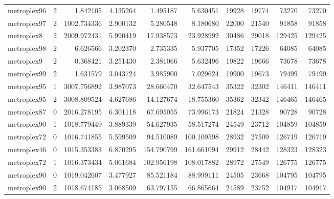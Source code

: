 \begin{longtable}{|l|r|r|r|r|r|r|r|r|r|}
metroplex96 & 2 & 1.842105 & 4.135264 & 1.495187 & 5.630451 & 19928 & 19774 & 73270 & 73270 \\
metroplex97 & 2 & 1002.734336 & 2.900132 & 5.280548 & 8.180680 & 22000 & 21540 & 91858 & 91858 \\
metroplex8 & 2 & 2009.972431 & 5.990419 & 17.938573 & 23.928992 & 30486 & 29018 & 129425 & 129425 \\
metroplex98 & 2 & 6.626566 & 3.202370 & 2.735335 & 5.937705 & 17352 & 17226 & 64085 & 64085 \\
metroplex9 & 2 & 0.368421 & 3.251430 & 2.381066 & 5.632496 & 19822 & 19666 & 73678 & 73678 \\
metroplex99 & 2 & 1.631579 & 3.043724 & 3.985900 & 7.029624 & 19900 & 19673 & 79499 & 79499 \\
metroplex95 & 1 & 3007.756892 & 3.987073 & 28.660470 & 32.647543 & 35322 & 32302 & 146411 & 146411 \\
metroplex95 & 2 & 3008.809524 & 4.627686 & 14.127674 & 18.755360 & 35362 & 32342 & 146465 & 146465 \\
metroplex87 & 0 & 2016.278195 & 6.301118 & 67.695055 & 73.996173 & 21824 & 21328 & 90728 & 90728 \\
metroplex90 & 1 & 1018.779449 & 3.889339 & 54.627935 & 58.517274 & 24549 & 23712 & 104859 & 104859 \\
metroplex72 & 0 & 1016.741855 & 5.599509 & 94.510089 & 100.109598 & 28932 & 27509 & 126719 & 126719 \\
metroplex46 & 0 & 1015.353383 & 6.870295 & 154.790799 & 161.661094 & 29912 & 28442 & 128323 & 128323 \\
metroplex72 & 1 & 1016.373434 & 5.061684 & 102.956198 & 108.017882 & 28972 & 27549 & 126775 & 126775 \\
metroplex90 & 0 & 1019.042607 & 3.477927 & 85.521184 & 88.999111 & 24505 & 23668 & 104795 & 104795 \\
metroplex90 & 2 & 1018.674185 & 3.068509 & 63.797155 & 66.865664 & 24589 & 23752 & 104917 & 104917 \\
\end{longtable}
